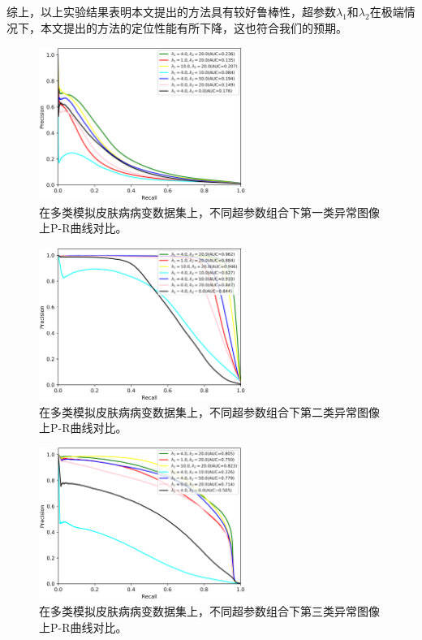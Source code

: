 综上，以上实验结果表明本文提出的方法具有较好鲁棒性，超参数$\lambda_{1}$和$\lambda_{2}$在极端情况下，本文提出的方法的定位性能有所下降，这也符合我们的预期。
\begin{figure}[H]
	\centering
	\includegraphics[width=0.6\textwidth]{figure/pr_curve_multi_skin_hyper_paras/IMAGE_NET_pr_curve.png}
	\caption[不同超参数组合下第一类异常图像上P-R曲线对比]{在多类模拟皮肤病病变数据集上，不同超参数组合下第一类异常图像上P-R曲线对比。} 
	\label{fig:multi_simulate_pr_curve_image_net_hyper_paras}
\end{figure}
\vspace{-0.3cm}
\begin{figure}[H]
	\centering
	\includegraphics[width=0.6\textwidth]{figure/pr_curve_multi_skin_hyper_paras/SKIN_pr_curve.png}
	\caption[不同超参数组合下第二类异常图像上P-R曲线对比]{在多类模拟皮肤病病变数据集上，不同超参数组合下第二类异常图像上P-R曲线对比。}
	\label{fig:multi_simulate_pr_curve_skin_hyper_paras}
\end{figure}
\begin{figure}[H]
	\centering
	\includegraphics[width=0.6\textwidth]{figure/pr_curve_multi_skin_hyper_paras/CIRCLE_pr_curve.png}
	\caption[不同超参数组合下第三类异常图像上P-R曲线对比]{在多类模拟皮肤病病变数据集上，不同超参数组合下第三类异常图像上P-R曲线对比。} 
	\label{fig:multi_simulate_pr_curve_circle_hyper_paras}
\end{figure}

